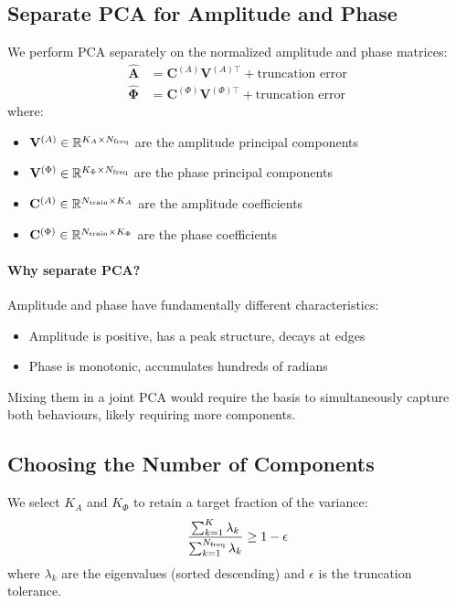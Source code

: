 \documentclass[11pt,a4paper]{article}
\begin{document}
\subsection{Separate PCA for Amplitude and Phase}

We perform PCA separately on the normalized amplitude and phase matrices:
\begin{align}
    \hat{\mathbf{A}} &= \mathbf{C}^{(A)} \mathbf{V}^{(A)\top} + \text{truncation error} \\
    \hat{\mathbf{\Phi}} &= \mathbf{C}^{(\Phi)} \mathbf{V}^{(\Phi)\top} + \text{truncation error}
\end{align}
where:
\begin{itemize}
    \item $\mathbf{V}^{(A)} \in \mathbb{R}^{K_A \times N_{\rm freq}}$ are the amplitude principal components
    \item $\mathbf{V}^{(\Phi)} \in \mathbb{R}^{K_\Phi \times N_{\rm freq}}$ are the phase principal components
    \item $\mathbf{C}^{(A)} \in \mathbb{R}^{N_{\rm train} \times K_A}$ are the amplitude coefficients
    \item $\mathbf{C}^{(\Phi)} \in \mathbb{R}^{N_{\rm train} \times K_\Phi}$ are the phase coefficients
\end{itemize}

\paragraph{Why separate PCA?}
Amplitude and phase have fundamentally different characteristics:
\begin{itemize}
    \item Amplitude is positive, has a peak structure, decays at edges
    \item Phase is monotonic, accumulates hundreds of radians
\end{itemize}
Mixing them in a joint PCA would require the basis to simultaneously capture both behaviours, likely requiring more components.

\subsection{Choosing the Number of Components}

We select $K_A$ and $K_\Phi$ to retain a target fraction of the variance:
\begin{equation}
    \frac{\sum_{k=1}^{K} \lambda_k}{\sum_{k=1}^{N_{\rm freq}} \lambda_k} \geq 1 - \epsilon
\end{equation}
where $\lambda_k$ are the eigenvalues (sorted descending) and $\epsilon$ is the truncation tolerance.
\end{document}
